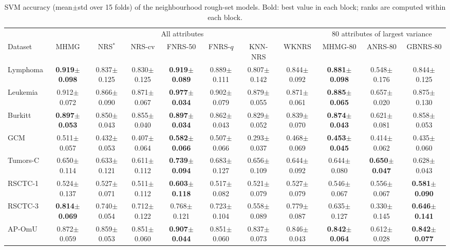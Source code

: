 \begin{table}[!t]
\centering
\caption{SVM accuracy (mean$\pm$std over 15 folds) of the neighbourhood rough-set models. Bold: best value in each block; ranks are computed within each block.}
\label{tab:fam_svm}
\scriptsize
\setlength{\tabcolsep}{1.6pt}
\begin{tabular*}{\textwidth}{@{\extracolsep{\fill}}lcccccccccc@{}}
\toprule
 & \multicolumn{7}{c}{All attributes} & \multicolumn{3}{c}{80 attributes of largest variance} \\
\cmidrule(lr){2-8}\cmidrule(l){9-11}
Dataset & MHMG & NRS$^*$ & NRS-cv & FNRS-50 & FNRS-$q$ & KNN-NRS & WKNRS & MHMG-80 & ANRS-80 & GBNRS-80 \\
\midrule
Lymphoma & \textbf{0.919$\pm$0.098} & 0.837$\pm$0.125 & 0.830$\pm$0.125 & \textbf{0.919$\pm$0.089} & 0.889$\pm$0.111 & 0.807$\pm$0.142 & 0.844$\pm$0.092 & \textbf{0.881$\pm$0.098} & 0.548$\pm$0.176 & 0.844$\pm$0.125 \\
Leukemia & 0.912$\pm$0.072 & 0.866$\pm$0.090 & 0.871$\pm$0.067 & \textbf{0.977$\pm$0.034} & 0.902$\pm$0.079 & 0.879$\pm$0.055 & 0.871$\pm$0.061 & \textbf{0.885$\pm$0.065} & 0.657$\pm$0.020 & 0.875$\pm$0.130 \\
Burkitt & \textbf{0.897$\pm$0.053} & 0.850$\pm$0.043 & 0.855$\pm$0.040 & \textbf{0.897$\pm$0.034} & 0.862$\pm$0.043 & 0.829$\pm$0.052 & 0.839$\pm$0.070 & \textbf{0.874$\pm$0.043} & 0.621$\pm$0.081 & 0.858$\pm$0.053 \\
GCM & 0.511$\pm$0.057 & 0.432$\pm$0.053 & 0.407$\pm$0.064 & \textbf{0.582$\pm$0.066} & 0.507$\pm$0.066 & 0.293$\pm$0.037 & 0.468$\pm$0.069 & \textbf{0.453$\pm$0.045} & 0.414$\pm$0.062 & 0.435$\pm$0.060 \\
Tumors-C & 0.650$\pm$0.114 & 0.633$\pm$0.121 & 0.611$\pm$0.112 & \textbf{0.739$\pm$0.094} & 0.683$\pm$0.127 & 0.656$\pm$0.109 & 0.644$\pm$0.092 & 0.644$\pm$0.080 & \textbf{0.650$\pm$0.047} & 0.628$\pm$0.043 \\
RSCTC-1 & 0.524$\pm$0.137 & 0.527$\pm$0.071 & 0.511$\pm$0.112 & \textbf{0.603$\pm$0.118} & 0.517$\pm$0.082 & 0.521$\pm$0.079 & 0.527$\pm$0.079 & 0.546$\pm$0.067 & 0.556$\pm$0.067 & \textbf{0.581$\pm$0.090} \\
RSCTC-3 & \textbf{0.814$\pm$0.069} & 0.740$\pm$0.054 & 0.712$\pm$0.122 & 0.768$\pm$0.121 & 0.723$\pm$0.104 & 0.558$\pm$0.089 & 0.779$\pm$0.087 & 0.635$\pm$0.127 & 0.330$\pm$0.145 & \textbf{0.646$\pm$0.141} \\
AP-OmU & 0.872$\pm$0.059 & 0.859$\pm$0.053 & 0.851$\pm$0.060 & \textbf{0.907$\pm$0.044} & 0.851$\pm$0.060 & 0.837$\pm$0.073 & 0.846$\pm$0.043 & \textbf{0.842$\pm$0.064} & 0.612$\pm$0.028 & \textbf{0.842$\pm$0.077} \\

\end{tabular*}
\end{table}
